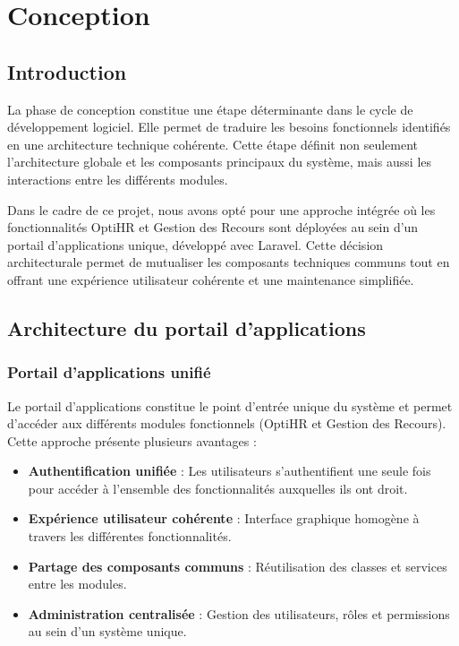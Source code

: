 \chapter{Conception}
\clearpage

\section{Introduction}
La phase de conception constitue une étape déterminante dans le cycle de développement logiciel. 
Elle permet de traduire les besoins fonctionnels identifiés en une architecture technique cohérente. 
Cette étape définit non seulement l'architecture globale et les composants principaux du système, 
mais aussi les interactions entre les différents modules.

Dans le cadre de ce projet, nous avons opté pour une approche intégrée où les fonctionnalités OptiHR et Gestion des Recours sont déployées au sein d'un portail d'applications unique, développé avec Laravel. Cette décision architecturale permet de mutualiser les composants techniques communs tout en offrant une expérience utilisateur cohérente et une maintenance simplifiée.

\section{Architecture du portail d'applications}

\subsection{Portail d'applications unifié}
Le portail d'applications constitue le point d'entrée unique du système et permet d'accéder aux différents modules fonctionnels (OptiHR et Gestion des Recours). Cette approche présente plusieurs avantages :

\begin{itemize}
    \item \textbf{Authentification unifiée} : Les utilisateurs s'authentifient une seule fois pour accéder à l'ensemble des fonctionnalités auxquelles ils ont droit.
    \item \textbf{Expérience utilisateur cohérente} : Interface graphique homogène à travers les différentes fonctionnalités.
    \item \textbf{Partage des composants communs} : Réutilisation des classes et services entre les modules.
    \item \textbf{Administration centralisée} : Gestion des utilisateurs, rôles et permissions au sein d'un système unique.
\end{itemize}

